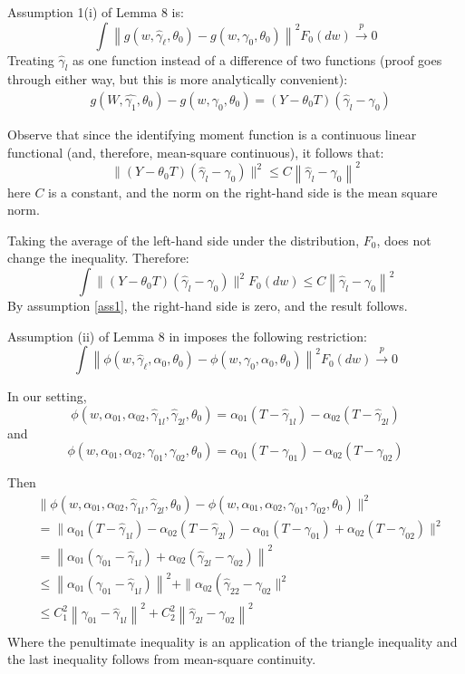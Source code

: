 Assumption 1(i) of Lemma 8 is:
\[
\int \left\|g\left(w, \hat{\gamma}_{\ell}, \theta_0\right)-g\left(w, \gamma_0, \theta_0\right)\right\|^2 F_0(d w) \xrightarrow{p} 0
\]
Treating $\hat{\gamma}_l$ as one function instead of a difference of two functions (proof goes through either way, but this is more analytically convenient):
\[
\begin{aligned} 
&g\left(W, \hat{\gamma_1}, \theta_0\right)-g\left(w, \gamma_0, \theta_0\right) =\left(Y-\theta_0 T\right) (\hat{\gamma}_l-\gamma_0) 
\end{aligned}
\]

Observe that since the identifying moment function is a continuous linear functional (and, therefore, mean-square continuous), it follows that:
\[
\|(Y-\theta_0 T) (\hat{\gamma}_l-\gamma_0)\|^2 \leq C\left\|\hat{\gamma}_l-\gamma_0\right\|^2
\]
here $C$ is a constant, and the norm on the right-hand side is the mean square norm.

Taking the average of the left-hand side under the distribution, $F_0$, does not change the inequality. Therefore:
\[
\int \|(Y-\theta_0 T) (\hat{\gamma}_l-\gamma_0)\|^2 F_0(d w) \leq C\left\|\hat{\gamma}_l-\gamma_0\right\|^2
\]
By assumption \ref{ass1}, the right-hand side is zero, and the result follows.

Assumption (ii) of Lemma 8 in \citet{chernozhukov2022locally} imposes the following restriction: 
\[
\int\left\|\phi\left(w, \hat{\gamma}_{\ell}, \alpha_0, \theta_0\right)-\phi\left(w, \gamma_0, \alpha_0, \theta_0\right)\right\|^2 F_0(d w) \xrightarrow{p} 0
\]

In our setting, 
\[
\phi\left(w, \alpha_{01}, \alpha_{02}, \hat{\gamma}_{1 l}, \hat{\gamma}_{2 l}, \theta_0\right)=\alpha_{01}\left(T-\hat{\gamma}_{1 l}\right)-\alpha_{02}\left(T-\hat{\gamma}_{2 l}\right)
\]
and 
\[
\phi\left(w, \alpha_{01}, \alpha_{02}, \gamma_{01}, \gamma_{02}, \theta_0\right)=\alpha_{01}\left(T-\gamma_{01}\right)-\alpha_{02}\left(T-\gamma_{02}\right)
\]

Then
\begin{align*}
& \| \phi\left(w, \alpha_{01}, \alpha_{02}, \hat{\gamma}_{1 l}, \hat{\gamma}_{2 l},  \theta_0\right)- \phi\left(w, \alpha_{01}, \alpha_{02}, \gamma_{01}, \gamma_{02}, \theta_0\right) \|^2\\
&= \| \alpha_{01}\left(T-\hat{\gamma}_{1 l}\right)-\alpha_{02}\left(T-\hat{\gamma}_{2 l}\right)-\alpha_{01}\left(T-\gamma_{01}\right)+\alpha_{02}\left(T-\gamma_{02}\right) \|^2 \\
& =\left\|\alpha_{01}\left(\gamma_{01}-\hat{\gamma}_{1 l}\right)+\alpha_{02}\left(\hat{\gamma}_{2 l}-\gamma_{02}\right)\right\|^2 \\
& \leq\left\|\alpha_{01}\left(\gamma_{01}-\hat{\gamma}_{1 l}\right)\right\|^2+\| \alpha_{02}\left(\hat{\gamma}_{22}-\gamma_{02} \|^2\right. \\
&\leq C_1^2\left\|\gamma_{01}-\hat{\gamma}_{1 l}\right\|^2+C_2^2\left\|\hat{\gamma}_{2 l}-\gamma_{02}\right\|^2 \\
\end{align*}
 Where the penultimate inequality is an application of the triangle inequality and the last inequality follows from mean-square continuity.
 
